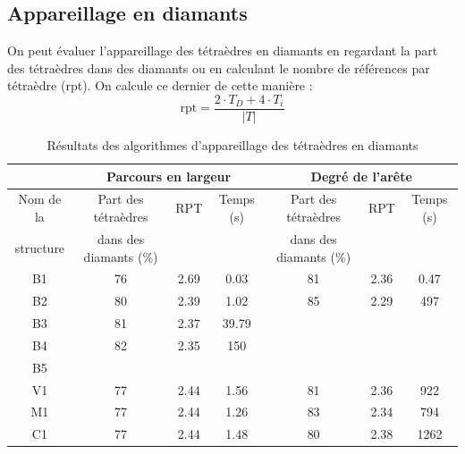 \subsection{Appareillage en diamants}
\noindent
On peut évaluer l'appareillage des tétraèdres en diamants en regardant la part des tétraèdres dans des diamants ou en calculant le nombre de références par tétraèdre (rpt). On calcule ce dernier de cette manière :\\
\begin{equation}
\text{rpt} = \frac{2\cdot T_D+4\cdot T_i}{|T|}
\end{equation}
\begin{table}[H]
\centering
\footnotesize
\begin{tabular}{|c | c | c | c| c | c | c |}
\hline
& \multicolumn{3}{|c|}{Parcours en largeur}& \multicolumn{3}{|c|}{Degré de l'arête}\\
\hline
Nom de la & Part des tétraèdres & RPT & Temps (s) & Part des tétraèdres & RPT & Temps (s)\\
structure&dans des diamants (\%)&&&dans des diamants (\%)&&\\
\hline
B1 & 76 & 2.69 & 0.03 & 81 & 2.36 & 0.47 \\
B2 &  80 & 2.39 & 1.02 & 85 & 2.29 & 497 \\
B3 & 81& 2.37 & 39.79 &  &  &\\
B4 & 82& 2.35 & 150 &  &  &\\
B5 &  &  &  &  &  &\\
V1 & 77& 2.44 & 1.56 & 81& 2.36 & 922\\
M1 & 77& 2.44 & 1.26 & 83 & 2.34 & 794\\
C1 & 77& 2.44 & 1.48 & 80 & 2.38 & 1262\\
\hline  
\end{tabular}
\caption{Résultats des algorithmes d'appareillage des tétraèdres en diamants}
\label{tab:results_performances}
\end{table}

